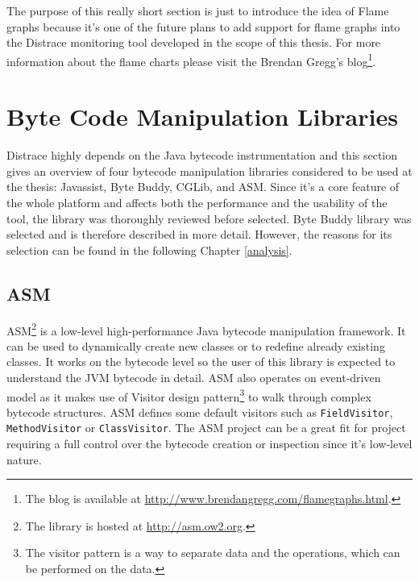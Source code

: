 The purpose of this really short section is just to introduce the idea of Flame graphs because it's one of the future plans to add support for flame graphs into the Distrace monitoring tool developed in the scope of this thesis. For more information about the flame charts please visit the Brendan Gregg's blog\footnote{The blog is available at \url{http://www.brendangregg.com/flamegraphs.html}.}.
\section{Byte Code Manipulation Libraries}
Distrace highly depends on the Java bytecode instrumentation and this section gives an overview of four bytecode manipulation libraries considered to be used at the thesis: Javassist, Byte Buddy, CGLib, and ASM. Since it's a core feature of the whole platform and affects both the performance and the usability of the tool, the library was thoroughly reviewed before selected. Byte Buddy library was selected and is therefore described in more detail. However, the reasons for its selection can be found in the following Chapter \ref{analysis}.

\subsection{ASM}
\label{asm}
ASM\footnote{The library is hosted at \url{http://asm.ow2.org}.} is a low-level high-performance Java bytecode manipulation framework. It can be used to dynamically create new classes or to redefine already existing classes. It works on the bytecode level so the user of this library is expected to understand the JVM bytecode in detail. ASM also operates on event-driven model as it makes use of Visitor design pattern\footnote{The visitor pattern is a way to separate data and the operations, which can be performed on the data.} to walk through complex bytecode structures. ASM defines some default visitors such as \texttt{FieldVisitor}, \texttt{MethodVisitor} or \texttt{ClassVisitor}. The ASM project can be a great fit for project requiring a full control over the bytecode creation or inspection since it's low-level nature.
